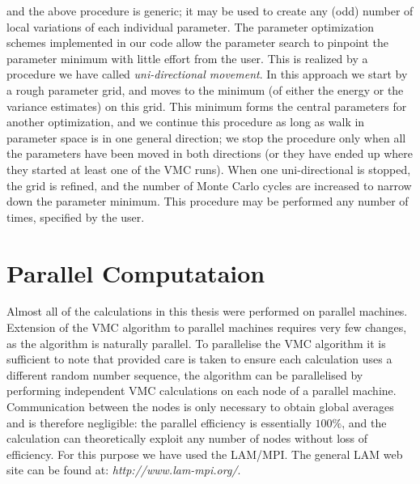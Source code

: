 and the above procedure is generic; it may be used to create any (odd)
number of local variations of each individual parameter. 
\newline
%
\newline
The parameter optimization schemes implemented in our code allow the
parameter search to pinpoint the parameter minimum with little effort
from the user. This is realized by a procedure we have called
\emph{uni-directional movement}. In this approach we start by a 
rough parameter grid, and moves to the minimum (of either the energy
or the variance estimates) on this grid. This minimum forms the
central parameters for another optimization, and we continue this
procedure as long as walk in parameter space is in one general
direction; we stop the procedure only when all the parameters have
been moved in both directions (or they have ended up where they started
at least one of the VMC runs). When one uni-directional is stopped,
the grid is refined, and the number of Monte Carlo cycles are
increased to narrow down the parameter minimum. This procedure may be
performed any number of times, specified by the user.



\section{Parallel Computataion}
\label{ParallelComputataion}

Almost all of the calculations in this thesis were performed on
parallel machines. Extension of the VMC algorithm to
parallel machines requires very few changes, as the algorithm is
naturally parallel. To parallelise the VMC algorithm it is sufficient
to note that provided care is taken to ensure each calculation uses a
different random number sequence, the algorithm can be parallelised by 
performing independent VMC calculations on each node of a parallel
machine. Communication between the nodes is only necessary to obtain
global averages and is therefore negligible: the parallel efficiency
is essentially $100\%$, and the calculation can theoretically exploit
any number of nodes without loss of efficiency. For this purpose we
have used the LAM/MPI. The general LAM web site can be found at:
\emph{http://www.lam-mpi.org/}.




